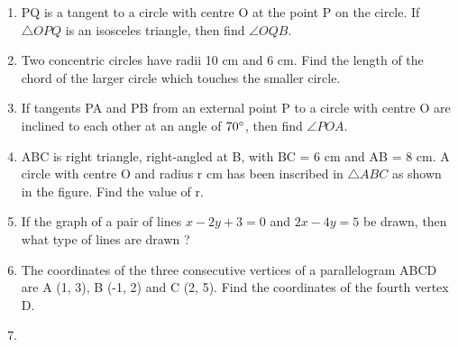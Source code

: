 \documentclass{exam}
\begin{document}
\begin{enumerate}

		\item PQ is a tangent to a circle with centre O at the point P on the circle. If $\triangle OPQ$ is an isosceles triangle, then find $\angle OQB$. 
		
		\item Two concentric circles have radii 10 cm and 6 cm. Find the length of the chord of the larger circle which touches the smaller circle. 
		
		\item If tangents PA and PB from an external point P to a circle with centre O are inclined to each other at an angle of $70\degree$, then find $\angle POA$. 
		
		\item ABC is right triangle, right-angled at B, with BC = 6 cm and AB = 8 cm. A circle with centre O and radius r cm has been inscribed in $\triangle ABC$ as shown in the figure. Find the value of r. 
		

		\item If the graph of a pair of lines $x - 2y + 3 = 0$ and $2x - 4y = 5$ be drawn, then what type of lines are drawn ? 
		
		\item The coordinates of the three consecutive vertices of a parallelogram ABCD are A (1, 3), B (-1, 2) and C (2, 5). Find the coordinates of the fourth vertex D. 
		
		\item
		

\end{enumerate}
\end{document}
